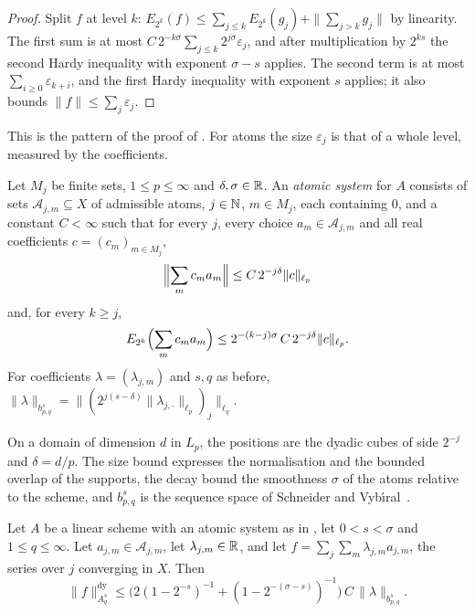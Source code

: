 \begin{proof}
\leanok
{}
Split $f$ at level $k$: $E_{2^k}(f) \leq \sum_{j \leq k} E_{2^k}(g_j) + \|\sum_{j > k} g_j\|$
by linearity. The first sum is at most $C \, 2^{-k\sigma} \sum_{j \leq k} 2^{j\sigma}
\varepsilon_j$, and after multiplication by $2^{ks}$ the second Hardy inequality with exponent
$\sigma - s$ applies. The second term is at most $\sum_{i \geq 0} \varepsilon_{k+i}$, and the
first Hardy inequality with exponent $s$ applies; it also bounds $\|f\| \leq \sum_j
\varepsilon_j$.
\end{proof}

This is the pattern of the proof of . For atoms the size
$\varepsilon_j$ is that of a whole level, measured by the coefficients.

\begin{definition}
\label{def:atomic-system}
\leanok
{}
Let $M_j$ be finite sets, $1 \leq p \leq \infty$ and $\delta, \sigma \in \mathbb{R}$. An \emph{atomic
system} for $A$ consists of sets $\mathcal{A}_{j,m} \subseteq X$ of admissible atoms, $j \in
\mathbb{N}$, $m \in M_j$, each containing $0$, and a constant $C < \infty$ such that for every $j$,
every choice $a_m \in \mathcal{A}_{j,m}$ and all real coefficients $c = (c_m)_{m \in M_j}$,
\[
  \Bigl\| \sum_m c_m a_m \Bigr\| \leq C \, 2^{-j\delta} \|c\|_{\ell_p}
\]
and, for every $k \geq j$,
\[
  E_{2^k}\Bigl(\sum_m c_m a_m\Bigr) \leq 2^{-(k-j)\sigma} \, C \, 2^{-j\delta} \|c\|_{\ell_p} .
\]
For coefficients $\lambda = (\lambda_{j,m})$ and $s, q$ as before,
$\|\lambda\|_{b^s_{p,q}} = \|(2^{j(s-\delta)} \|\lambda_{j,\cdot}\|_{\ell_p})_j\|_{\ell_q}$.
\end{definition}

On a domain of dimension $d$ in $L_p$, the positions are the dyadic cubes of side $2^{-j}$ and
$\delta = d/p$. The size bound expresses the normalisation and the bounded overlap of the
supports, the decay bound the smoothness $\sigma$ of the atoms relative to the scheme, and
$b^s_{p,q}$ is the sequence space of Schneider and Vyb\'{\i}ral~\cite{SchneiderVybiral}.

\begin{theorem}
\label{thm:atomic-synthesis}
\leanok
{}
Let $A$ be a linear scheme with an atomic system as in , let
$0 < s < \sigma$ and $1 \leq q \leq \infty$. Let $a_{j,m} \in \mathcal{A}_{j,m}$, let
$\lambda_{j,m} \in \mathbb{R}$, and let $f = \sum_j \sum_m \lambda_{j,m} a_{j,m}$, the series over $j$
converging in $X$. Then
\[
  \|f\|^{\mathrm{dy}}_{A^s_q} \leq \bigl(2 (1 - 2^{-s})^{-1} + (1 - 2^{-(\sigma - s)})^{-1}\bigr)
  \, C \, \|\lambda\|_{b^s_{p,q}} .
\]
\end{theorem}

